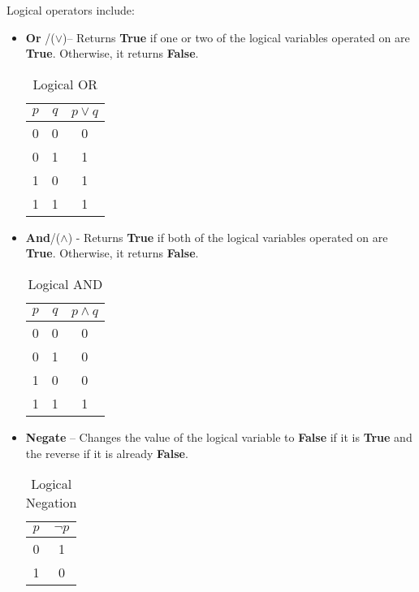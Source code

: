 \documentclass{article}
\begin{document}
Logical operators include:
\begin{itemize}
  \item \textbf{Or} /($\vee$)– Returns \textbf{True} if one or two of the logical variables operated on are \textbf{True}. Otherwise, it returns \textbf{False}.

\begin{table}[ht]
    \centering
    \begin{tabular}{|l|c|c|} \hline 
          $p$&  $q$& $p\vee q$\\ \hline 
          0&  0& 0\\ \hline 
          0&  1& 1\\ \hline 
          1&  0& 1\\ \hline 
          1&  1& 1\\ \hline
    \end{tabular}
    \caption{Logical OR}
    \label{tab:my_label_one}
\end{table}
  \item \textbf{And}/($\wedge$) - Returns \textbf{True} if both of the logical variables operated on are \textbf{True}. Otherwise, it returns \textbf{False}.

\begin{table}[ht]
    \centering
    \begin{tabular}{|c|c|c|} \hline 
         $p$&  $q$& $p\wedge q$\\ \hline 
         0&  0& 0\\ \hline 
         0&  1& 0\\ \hline 
         1&  0& 0\\ \hline 
 1& 1&1\\ \hline
    \end{tabular}
    \caption{Logical AND}
    \label{tab:my_label_two}
\end{table}
  \item \textbf{Negate} – Changes the value of the logical variable to \textbf{False} if it is \textbf{True} and the reverse if it is already \textbf{False}.

\begin{table}[ht]
    \centering
    \begin{tabular}{|c|c|} \hline 
         $p$& $\neg p$\\ \hline 
         0& 1\\ \hline 
         1& 0\\ \hline
    \end{tabular}
    \caption{Logical Negation}
    \label{tab:my_label_three}
\end{table}

\end{itemize}
\end{document}
